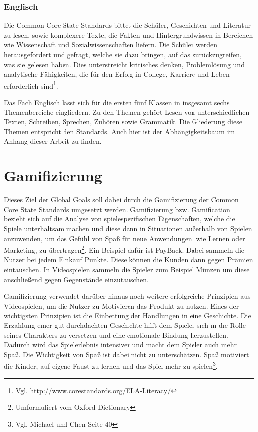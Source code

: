 \subsubsection{Englisch}
Die Common Core State Standards bittet die Schüler, Geschichten und Literatur zu lesen, sowie komplexere Texte, die Fakten und Hintergrundwissen in Bereichen wie Wissenschaft und Sozialwissenschaften liefern. Die Schüler werden herausgefordert und gefragt, welche sie dazu bringen, auf das zurückzugreifen, was sie gelesen haben. Dies unterstreicht kritisches denken, Problemlösung und analytische Fähigkeiten, die für den Erfolg in College, Karriere und Leben erforderlich sind\footnote{Vgl. \url{http://www.corestandards.org/ELA-Literacy/}}.

Das Fach Englisch lässt sich für die ersten fünf Klassen in insgesamt sechs Themenbereiche eingliedern. Zu den Themen gehört Lesen von unterschiedlichen Texten, Schreiben, Sprechen, Zuhören sowie Grammatik. Die Gliederung diese Themen entspricht den Standards. Auch hier ist der Abhängigkeitsbaum im Anhang dieser Arbeit zu finden.

\section{Gamifizierung}
Dieses Ziel der Global Goals soll dabei durch die Gamifizierung der Common Core State Standards umgesetzt werden. Gamifizierung bzw. Gamification bezieht sich auf die Analyse von spielespezifischen Eigenschaften, welche die Spiele unterhaltsam machen und diese dann in Situationen außerhalb von Spielen anzuwenden, um das Gefühl von Spaß für neue Anwendungen, wie Lernen oder Marketing, zu übertragen\footnote{Umformuliert vom Oxford Dictionary}. Ein Beispiel dafür ist PayBack. Dabei sammeln die Nutzer bei jedem Einkauf Punkte. Diese können die Kunden dann gegen Prämien eintauschen. In Videospielen sammeln die Spieler zum Beispiel Münzen um diese anschließend gegen Gegenstände einzutauschen. 

Gamifizierung verwendet darüber hinaus noch weitere erfolgreiche Prinzipien aus Videospielen, um die Nutzer zu Motivieren das Produkt zu nutzen. Eines der wichtigsten Prinzipien ist die Einbettung der Handlungen in eine Geschichte. Die Erzählung einer gut durchdachten Geschichte hilft dem Spieler sich in die Rolle seines Charakters zu versetzen und eine emotionale Bindung herzustellen. Dadurch wird das Spielerlebnis intensiver und macht dem Spieler auch mehr Spaß. Die Wichtigkeit von Spaß ist dabei nicht zu unterschätzen. Spaß motiviert die Kinder, auf eigene Faust zu lernen und das Spiel mehr zu spielen\footnote{Vgl. Michael und Chen \cite{seriousGamesFun} Seite 40}.

